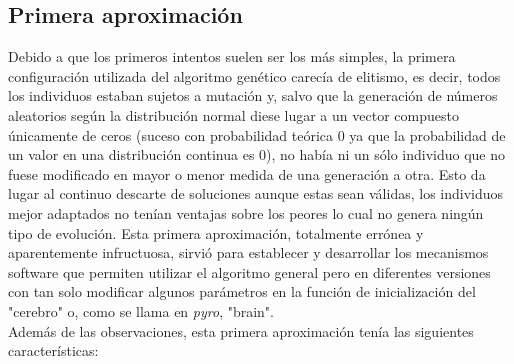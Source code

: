 \documentclass[12pt,spanish]{article}
\begin{document}
\subsection{Primera aproximación}
Debido a que los primeros intentos suelen ser los más simples, la primera configuración utilizada del algoritmo genético carecía de elitismo, es decir, todos los individuos estaban sujetos a mutación y, salvo que la generación de números aleatorios según la distribución normal diese lugar a un vector compuesto únicamente de ceros (suceso con probabilidad teórica 0 ya que la probabilidad de un valor en una distribución continua es 0), no había ni un sólo individuo que no fuese modificado en mayor o menor medida de una generación a otra. Esto da lugar al continuo descarte de soluciones aunque estas sean válidas, los individuos mejor adaptados no tenían ventajas sobre los peores lo cual no genera ningún tipo de evolución. Esta primera aproximación, totalmente errónea y aparentemente infructuosa, sirvió para establecer y desarrollar los mecanismos software que permiten utilizar el algoritmo general pero en diferentes versiones con tan solo modificar algunos parámetros en la función de inicialización del "cerebro" o, como se llama en \textit{pyro}, "brain".\\
Además de las observaciones, esta primera aproximación tenía las siguientes características:\\
\end{document}
